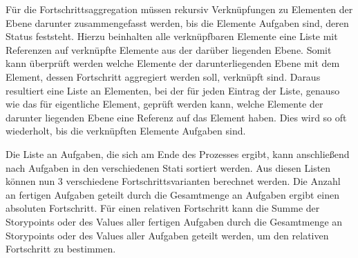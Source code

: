 Für die Fortschrittsaggregation müssen rekursiv Verknüpfungen zu Elementen der Ebene darunter zusammengefasst werden, bis die Elemente Aufgaben sind, deren Status feststeht. Hierzu beinhalten alle verknüpfbaren Elemente eine Liste mit Referenzen auf verknüpfte Elemente aus der darüber liegenden Ebene. Somit kann überprüft werden welche Elemente der darunterliegenden Ebene mit dem Element, dessen Fortschritt aggregiert werden soll, verknüpft sind. Daraus resultiert eine Liste an Elementen, bei der für jeden Eintrag der Liste, genauso wie das für eigentliche Element, geprüft werden kann, welche Elemente der darunter liegenden Ebene eine Referenz auf das Element haben. Dies wird so oft wiederholt, bis die verknüpften Elemente Aufgaben sind.

Die Liste an Aufgaben, die sich am Ende des Prozesses ergibt, kann anschließend nach Aufgaben in den verschiedenen Stati sortiert werden. Aus diesen Listen können nun 3 verschiedene Fortschrittsvarianten berechnet werden. Die Anzahl an fertigen Aufgaben geteilt durch die Gesamtmenge an Aufgaben ergibt einen absoluten Fortschritt. Für einen relativen Fortschritt kann die Summe der Storypoints oder des Values aller fertigen Aufgaben durch die Gesamtmenge an Storypoints oder des Values aller Aufgaben geteilt werden, um den relativen Fortschritt zu bestimmen.
